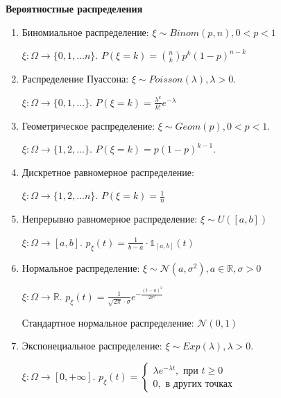 \begin{example}
    \textbf{Вероятностные распределения}

    \begin{enumerate}
        \item {
            Биномиальное распределение: $\xi \sim Binom(p, n), 0 < p < 1$

            $\xi : \Omega \to \{ 0, 1, \ldots n \}$. $P(\xi = k) = \binom{n}{k} p^k (1 - p)^{n - k}$ 
        }
        \item {
            Распределение Пуассона: $\xi \sim Poisson(\lambda), \lambda > 0$.

            $\xi : \Omega \to \{ 0, 1, \ldots \}$. $P(\xi = k) = \frac{\lambda^k}{k!}e^{-\lambda}$
        }
        \item {
            Геометрическое распределение: $\xi \sim Geom(p), 0 < p < 1$.

            $\xi : \Omega \to \{ 1, 2, \ldots \}$. $P(\xi = k) = p(1 - p)^{k - 1}$.
        }
        \item {
            Дискретное равномерное распределение: %

            $\xi : \Omega \to \{ 1, 2, \ldots n \}$. $P(\xi = k) = \frac{1}{n}$
        }
        \item {
            Непрерывно равномерное распределение: $\xi \sim U([a, b])$

            $\xi : \Omega \to [a, b]$. $p_{\xi}(t) = \frac{1}{b - a} \cdot \mathds{1}_{[a, b]} (t)$
        }
        \item {
            Нормальное распределение: $\xi \sim \mathcal{N} (a, \sigma^2), a \in \mathbb{R}, \sigma > 0$

            $\xi : \Omega \to \mathbb{R}$. $p_{\xi}(t) = \frac{1}{\sqrt{2\pi} \cdot \sigma} e^{-\frac{(t - a)^2}{2\sigma^2}}$

            Стандартное нормальное распределение: $\mathcal{N} (0, 1)$
        }
        \item { 
            Экспонециальное распределение: $\xi \sim Exp(\lambda), \lambda > 0$.

            $\xi : \Omega \to [0, +\infty]$. $p_{\xi}(t) = \begin{cases}
                \lambda e^{-\lambda t}, \text{ при } t \geqslant 0 \\
                0, \text{ в других точках}
            \end{cases}$
        }
    \end{enumerate}


\end{example}

